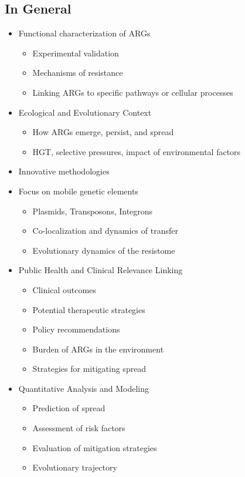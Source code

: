 \documentclass[11pt]{report}
\begin{document}
{\subsection{In General}  
\begin{itemize}
	\item Functional characterization of ARGs
	\begin{itemize}
		\item Experimental validation
		\item Mechanisms of resistance
		\item Linking ARGs to specific pathways or cellular processes
	\end{itemize}
	\item Ecological and Evolutionary Context
	\begin{itemize}
		\item How ARGs emerge, persist, and spread
		\item HGT, selective pressures, impact of environmental factors
	\end{itemize}
	\item Innovative methodologies
	\item Focus on mobile genetic elements
	\begin{itemize}
		\item Plasmids, Transposons, Integrons
		\item Co-localization and dynamics of transfer 
		\item Evolutionary dynamics of the resistome
	\end{itemize}
	\item Public Health and Clinical Relevance Linking
	\begin{itemize}
		\item Clinical outcomes 
		\item Potential therapeutic strategies 
		\item Policy recommendations
		\item Burden of ARGs in the environment
		\item Strategies for mitigating spread
	\end{itemize}
	\item Quantitative Analysis and Modeling
	\begin{itemize}
		\item Prediction of spread
		\item Assessment of risk factors
		\item Evaluation of mitigation strategies 
		\item Evolutionary trajectory

\end{itemize}
\end{itemize}}
\end{document}
